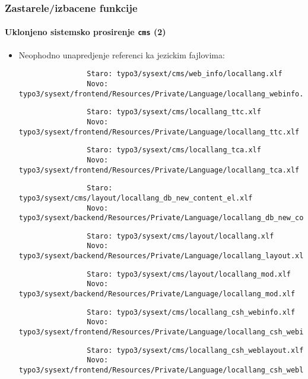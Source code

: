 \begin{frame}[fragile]
	\frametitle{Zastarele/izbacene funkcije}
	\framesubtitle{Uklonjeno sistemsko prosirenje \texttt{cms} (2)}

	\lstset{basicstyle=\tiny\ttfamily}

	\begin{itemize}

		\item Neophodno unapredjenje referenci ka jezickim fajlovima:


			\begin{lstlisting}
				Staro: typo3/sysext/cms/web_info/locallang.xlf
				Novo: typo3/sysext/frontend/Resources/Private/Language/locallang_webinfo.xlf
			\end{lstlisting}
			\vspace{-0.3cm}
			\begin{lstlisting}
				Staro: typo3/sysext/cms/locallang_ttc.xlf
				Novo: typo3/sysext/frontend/Resources/Private/Language/locallang_ttc.xlf
			\end{lstlisting}
			\vspace{-0.3cm}
			\begin{lstlisting}
				Staro: typo3/sysext/cms/locallang_tca.xlf
				Novo: typo3/sysext/frontend/Resources/Private/Language/locallang_tca.xlf
			\end{lstlisting}
			\vspace{-0.3cm}
			\begin{lstlisting}
				Staro: typo3/sysext/cms/layout/locallang_db_new_content_el.xlf
				Novo: typo3/sysext/backend/Resources/Private/Language/locallang_db_new_content_el.xlf
			\end{lstlisting}
			\vspace{-0.3cm}
			\begin{lstlisting}
				Staro: typo3/sysext/cms/layout/locallang.xlf
				Novo: typo3/sysext/backend/Resources/Private/Language/locallang_layout.xlf
			\end{lstlisting}
			\vspace{-0.3cm}
			\begin{lstlisting}
				Staro: typo3/sysext/cms/layout/locallang_mod.xlf
				Novo: typo3/sysext/backend/Resources/Private/Language/locallang_mod.xlf
			\end{lstlisting}
			\vspace{-0.3cm}
			\begin{lstlisting}
				Staro: typo3/sysext/cms/locallang_csh_webinfo.xlf
				Novo: typo3/sysext/frontend/Resources/Private/Language/locallang_csh_webinfo.xlf
			\end{lstlisting}
			\vspace{-0.3cm}
			\begin{lstlisting}
				Staro: typo3/sysext/cms/locallang_csh_weblayout.xlf
				Novo: typo3/sysext/frontend/Resources/Private/Language/locallang_csh_weblayout.xlf
			\end{lstlisting}


\end{itemize}
\end{frame}
